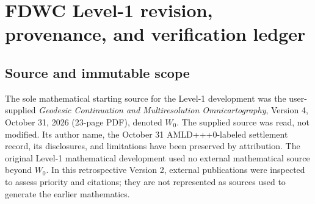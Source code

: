 \documentclass[11pt]{article}
\theoremstyle{definition}\newtheorem{definition}[theorem]{Definition}\newtheorem{assumption}[theorem]{Assumption}
\theoremstyle{remark}\newtheorem{remark}[theorem]{Remark}
\begin{document}
\appendix
\section{FDWC Level-1 revision, provenance, and verification ledger}
\label{app:ledger}
\subsection*{Source and immutable scope}
The sole mathematical starting source for the Level-1 development was the user-supplied \emph{Geodesic Continuation and Multiresolution Omnicartography}, Version 4, October 31, 2026 (23-page PDF), denoted $W_0$. The supplied source was read, not modified. Its author name, the October 31 AMLD+++0-labeled settlement record, its disclosures, and limitations have been preserved by attribution. The original Level-1 mathematical development used no external mathematical source beyond $W_0$. In this retrospective Version 2, external publications were inspected to assess priority and citations; they are not represented as sources used to generate the earlier mathematics.
\end{document}
